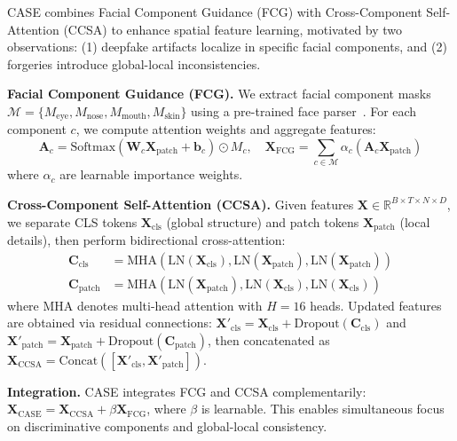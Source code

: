 CASE combines Facial Component Guidance (FCG) with Cross-Component Self-Attention (CCSA) to enhance spatial feature learning, motivated by two observations: (1) deepfake artifacts localize in specific facial components, and (2) forgeries introduce global-local inconsistencies.

\textbf{Facial Component Guidance (FCG).} We extract facial component masks $\mathcal{M} = \{M_{\text{eye}}, M_{\text{nose}}, M_{\text{mouth}}, M_{\text{skin}}\}$ using a pre-trained face parser~\cite{yu2018bisenet}. For each component $c$, we compute attention weights and aggregate features:
\begin{equation}
\mathbf{A}_c = \text{Softmax}(\mathbf{W}_c \mathbf{X}_{\text{patch}} + \mathbf{b}_c) \odot M_c, \quad
\mathbf{X}_{\text{FCG}} = \sum_{c \in \mathcal{M}} \alpha_c (\mathbf{A}_c \mathbf{X}_{\text{patch}})
\end{equation}
where $\alpha_c$ are learnable importance weights.

\textbf{Cross-Component Self-Attention (CCSA).} Given features $\mathbf{X} \in \mathbb{R}^{B \times T \times N \times D}$, we separate CLS tokens $\mathbf{X}_{\text{cls}}$ (global structure) and patch tokens $\mathbf{X}_{\text{patch}}$ (local details), then perform bidirectional cross-attention:
\begin{equation}
\begin{aligned}
\mathbf{C}_{\text{cls}} &= \text{MHA}(\text{LN}(\mathbf{X}_{\text{cls}}), \text{LN}(\mathbf{X}_{\text{patch}}), \text{LN}(\mathbf{X}_{\text{patch}})) \\
\mathbf{C}_{\text{patch}} &= \text{MHA}(\text{LN}(\mathbf{X}_{\text{patch}}), \text{LN}(\mathbf{X}_{\text{cls}}), \text{LN}(\mathbf{X}_{\text{cls}}))
\end{aligned}
\end{equation}
where MHA denotes multi-head attention with $H=16$ heads. Updated features are obtained via residual connections: $\mathbf{X}'_{\text{cls}} = \mathbf{X}_{\text{cls}} + \text{Dropout}(\mathbf{C}_{\text{cls}})$ and $\mathbf{X}'_{\text{patch}} = \mathbf{X}_{\text{patch}} + \text{Dropout}(\mathbf{C}_{\text{patch}})$, then concatenated as $\mathbf{X}_{\text{CCSA}} = \text{Concat}([\mathbf{X}'_{\text{cls}}, \mathbf{X}'_{\text{patch}}])$.

\textbf{Integration.} CASE integrates FCG and CCSA complementarily: $\mathbf{X}_{\text{CASE}} = \mathbf{X}_{\text{CCSA}} + \beta \mathbf{X}_{\text{FCG}}$, where $\beta$ is learnable. This enables simultaneous focus on discriminative components and global-local consistency.

